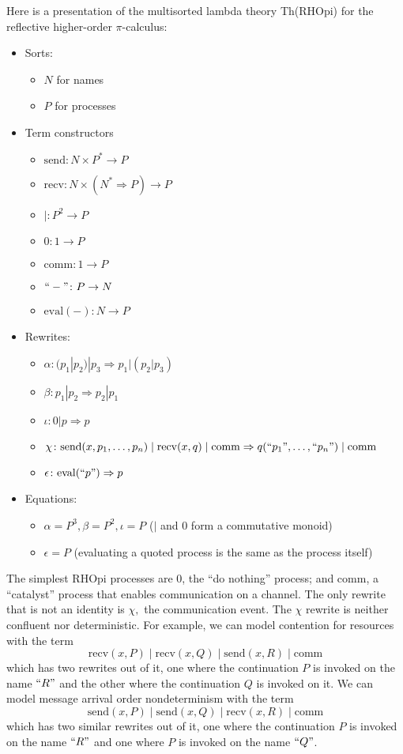 \documentclass{article}
\newcommand{\maps}{\colon}
\newcommand{\send}{\mathrm{send}}
\newcommand{\recv}{\mathrm{recv}}
\newcommand{\comm}{\mathrm{comm}}
\renewcommand{\quote}[1]{``#1"}
\newcommand{\deref}[1]{\mathrm{eval}(#1)}
\begin{document}
Here is a presentation of the multisorted lambda theory Th(RHOpi) for the reflective higher-order $\pi$-calculus:
\begin{itemize}
  \item Sorts:
  \begin{itemize}
    \item $N$ for names
    \item $P$ for processes
  \end{itemize}
  \item Term constructors
  \begin{itemize}
    \item $\send\maps N \times P^* \to P$
    \item $\recv\maps N \times (N^* \Rightarrow P) \to P$
    \item $|\maps P^2 \to P$
    \item $0\maps 1 \to P$
    \item $\comm\maps 1 \to P$
    \item $\quote{-}\maps P \to N$
    \item $\deref{-}\maps N \to P$
  \end{itemize}
  \item Rewrites:
  \begin{itemize}
    \item $\alpha\maps (p_1 | p_2) | p_3 \Rightarrow p_1 | (p_2 | p_3)$
    \item $\beta\maps p_1 | p_2 \Rightarrow p_2 | p_1$
    \item $\iota\maps 0 | p \Rightarrow p$
    \item $\chi\maps \send(x, p_1, \ldots, p_n) \;|\; \recv(x, q) \;|\; \comm \Rightarrow q(\quote{p_1}, \ldots, \quote{p_n}) \;|\; \comm$
    \item $\epsilon\maps \deref{\quote{p}} \Rightarrow p$
  \end{itemize}
  \item Equations:
  \begin{itemize}
    \item $\alpha = P^3, \beta = P^2, \iota = P$ ($|$ and 0 form a commutative monoid)
    \item $\epsilon = P$ (evaluating a quoted process is the same as the process itself)
  \end{itemize}
\end{itemize}

The simplest RHOpi processes are 0, the ``do nothing'' process; and comm, a ``catalyst'' process that enables communication on a channel.  The only rewrite that is not an identity is $\chi,$ the communication event.  The $\chi$ rewrite is neither confluent nor deterministic.  For example, we can model contention for resources with the term
\[ \recv(x, P)\;|\;\recv(x, Q)\;|\;\send(x,R)\;|\;\comm \]
which has two rewrites out of it, one where the continuation $P$ is invoked on the name $\quote{R}$ and the other where the continuation $Q$ is invoked on it.  We can model message arrival order nondeterminism with the term
\[ \send(x, P)\;|\;\send(x, Q)\;|\;\recv(x,R)\;|\;\comm \]
which has two similar rewrites out of it, one where the continuation $P$ is invoked on the name $\quote{R}$ and one where $P$ is invoked on the name $\quote{Q}$.
\end{document}
